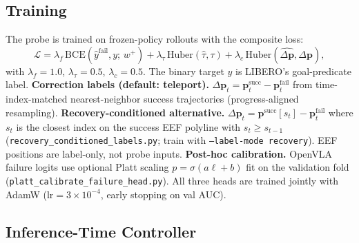 \subsection{Training}

The probe is trained on frozen-policy rollouts with the composite loss:
\begin{equation}
\mathcal{L} = \lambda_f\,\mathrm{BCE}(\hat{y}^{\mathrm{fail}}, y;\, w^+) + \lambda_\tau\,\mathrm{Huber}(\hat{\tau}, \tau) + \lambda_c\,\mathrm{Huber}(\widehat{\Delta\mathbf{p}}, \Delta\mathbf{p}),
\label{eq:loss}
\end{equation}
with $\lambda_f{=}1.0$, $\lambda_\tau{=}0.5$, $\lambda_c{=}0.5$. The binary target $y$ is LIBERO's goal-predicate label. \textbf{Correction labels (default: teleport).} $\Delta\mathbf{p}_t = \mathbf{p}^{\mathrm{succ}}_t - \mathbf{p}^{\mathrm{fail}}_t$ from time-index-matched nearest-neighbor success trajectories (progress-aligned resampling). \textbf{Recovery-conditioned alternative.} $\Delta\mathbf{p}_t = \mathbf{p}^{\mathrm{succ}}[s_t] - \mathbf{p}^{\mathrm{fail}}_t$ where $s_t$ is the closest index on the success EEF polyline with $s_t \ge s_{t-1}$ (\texttt{recovery\_conditioned\_labels.py}; train with \texttt{--label-mode recovery}). EEF positions are label-only, not probe inputs. \textbf{Post-hoc calibration.} OpenVLA failure logits use optional Platt scaling $p{=}\sigma(a\ell{+}b)$ fit on the validation fold (\texttt{platt\_calibrate\_failure\_head.py}). All three heads are trained jointly with AdamW ($\mathrm{lr}{=}3{\times}10^{-4}$, early stopping on val AUC).

\subsection{Inference-Time Controller}

